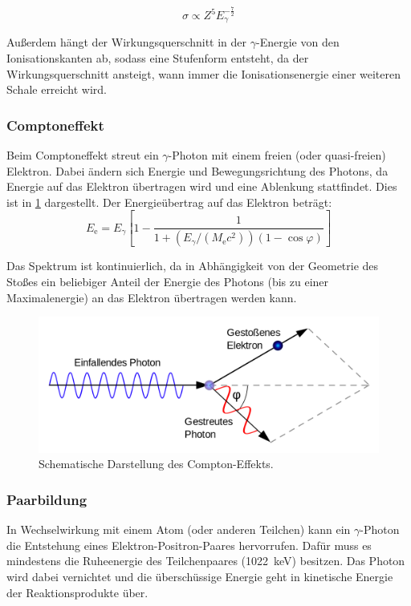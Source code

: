 \documentclass[
	a4paper,
	12pt,
	pagesize,
	ngerman
]{scrartcl}
\begin{document}
	\begin{equation}
		\label{eq_photo_wirk}
		\sigma \propto Z^5 E_\gamma^{-\frac{7}{2}}
	\end{equation}

	Außerdem hängt der Wirkungsquerschnitt in der $\gamma$-Energie von den Ionisationskanten ab, sodass eine Stufenform entsteht, da der Wirkungsquerschnitt ansteigt, wann immer die Ionisationsenergie einer weiteren Schale erreicht wird.

	\subsubsection{Comptoneffekt}

	Beim Comptoneffekt streut ein $\gamma$-Photon mit einem freien (oder quasi-freien) Elektron.
	Dabei ändern sich Energie und Bewegungsrichtung des Photons, da Energie auf das Elektron übertragen wird und eine Ablenkung stattfindet.
	Dies ist in \cref{fig_Compton} dargestellt.
	Der Energieübertrag auf das Elektron beträgt:
	\begin{equation}
		\label{eq_compton_energie}
		E_\text{e} = E_\gamma \left[ 1 - \frac{1}{1+(E_\gamma /(M_\text{e} c^2))(1-\cos \varphi)} \right]
	\end{equation}

	Das Spektrum ist kontinuierlich, da in Abhängigkeit von der Geometrie des Stoßes ein beliebiger Anteil der Energie des Photons (bis zu einer Maximalenergie) an das Elektron übertragen werden kann.

	\begin{figure}[H]
			\includegraphics[width= 0.5 \linewidth]{charts/Comptonstreuung}
			\caption{
				Schematische Darstellung des Compton-Effekts.
				\cite{comptonwiki}
			}
			\label{fig_Compton}
	\end{figure}

	\subsubsection{Paarbildung}
	In Wechselwirkung mit einem Atom (oder anderen Teilchen) kann ein $\gamma$-Photon die Entstehung eines Elektron-Positron-Paares hervorrufen.
	Dafür muss es mindestens die Ruheenergie des Teilchenpaares (\SI{1022}{keV}) besitzen.
	Das Photon wird dabei vernichtet und die überschüssige Energie geht in kinetische Energie der Reaktionsprodukte über.
\end{document}

